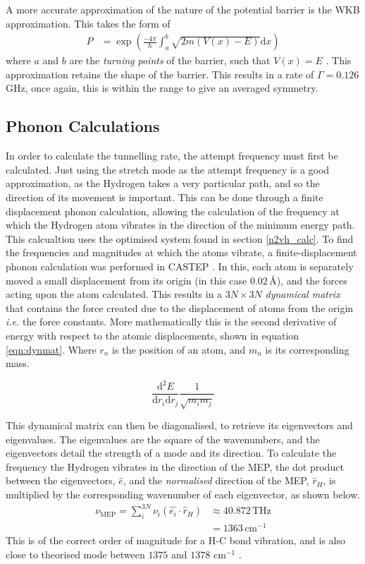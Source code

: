 \documentclass[10pt,a4paper,twocolumn,twoside]{extarticle}
\renewcommand{\d}{\text{d}}
\begin{document}
A more accurate approximation of the nature of the potential barrier is the WKB approximation. This takes the form of 
\begin{align}
    P &= \exp(\frac{-4\pi}{h}\int_{a}^{b}\sqrt{2m(V(x)-E)}{\d}x)
\end{align}
where $a$ and $b$ are the \emph{turning points} of the barrier, such that $V(x) = E$ \cite{butorac}. This approximation retains the shape of the barrier. This results in a rate of $\Gamma = 0.126$\,GHz, once again, this is within the range to give an averaged symmetry. 


\subsection{Phonon Calculations}
\label{phonon}
In order to calculate the tunnelling rate, the attempt frequency must first be calculated. Just using the stretch mode as the attempt frequency is a good approximation, as the Hydrogen takes a very particular path, and so the direction of its movement is important. This can be done through a finite displacement phonon calculation, allowing the calculation of the frequency at which the Hydrogen atom vibrates in the direction of the minimum energy path. This calcualtion uses the optimised system found in section \ref{n2vh_calc}. To find the frequencies and magnitudes at which the atoms vibrate, a finite-displacement phonon calculation was performed in CASTEP \cite{DynamicalMatrix}. In this, each atom is separately moved a small displacement from its origin (in this case $0.02$\,{\AA}), and the forces acting upon the atom calculated. This results in a $3N\times3N$ \emph{dynamical matrix} that contains the force created due to the displacement of atoms from the origin \emph{i.e.} the force constants. More mathematically this is the second derivative of energy with respect to the atomic displacements, shown in equation \ref{eqn:dynmat}. Where $r_n$ is the position of an atom, and $m_n$ is its corresponding mass.

\begin{equation}
	\label{eqn:dynmat}
	\frac{\d^2E}{ {\d}r_i {\d}r_j} \frac{1}{\sqrt{m_i m_j}}
\end{equation}



This dynamical matrix can then be diagonalised, to retrieve its eigenvectors and eigenvalues. The eigenvalues are the square of the wavenumbers, and the eigenvectors detail the strength of a mode and its direction. To calculate the frequency the Hydrogen vibrates in the direction of the MEP, the dot product between the eigenvectors, $\hat{e}$, and the \emph{normalised} direction of the MEP, $\hat{r}_H$, is multiplied by the corresponding wavenumber of each eigenvector, as shown below. 
\begin{align}
    \nu_{\text{MEP}} = \sum_{i}^{3N} \nu_i (\hat{e_i} \cdot \hat{r}_H) &\approx 40.872\,\text{THz}\\ 
	&= 1363\,\text{cm}^{-1} \nonumber
\end{align}
This is of the correct order of magnitude for a H-C bond vibration, and is also close to theorised mode between $1375$ and $1378$ cm$^{-1}$ \cite{Peaker,Hartland}.
\end{document}
